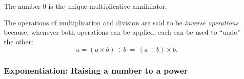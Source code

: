 \begin{prop}
The number $0$ is the unique multiplicative annihilator.
\end{prop}

\medskip

The operations of multiplication and division are said to be {\em
  inverse operations}
because, whenever both operations can be applied, each can be used to
``undo'' the other:
\[ a = (a \times b) \div b \ = \ (a \div b) \times b.  \]

\subsubsection{Exponentiation: Raising a number to a power}
\label{sec:exponentiation}

